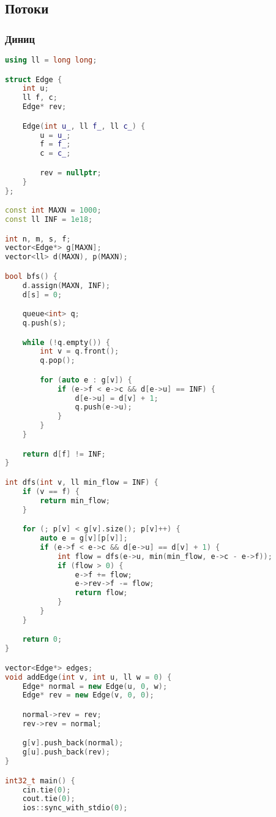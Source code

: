 \documentclass[10pt,a4paper,landscape,twosided]{extarticle}
\begin{document}
\begin{multicols}{3}
\subsection{Потоки}

\subsubsection{Диниц}
\begin{lstlisting}[language=C++]
using ll = long long;

struct Edge {
    int u;
    ll f, c;
    Edge* rev;

    Edge(int u_, ll f_, ll c_) {
        u = u_;
        f = f_;
        c = c_;

        rev = nullptr;
    }
};

const int MAXN = 1000;
const ll INF = 1e18;

int n, m, s, f;
vector<Edge*> g[MAXN];
vector<ll> d(MAXN), p(MAXN);

bool bfs() {
    d.assign(MAXN, INF);
    d[s] = 0;

    queue<int> q;
    q.push(s);

    while (!q.empty()) {
        int v = q.front();
        q.pop();

        for (auto e : g[v]) {
            if (e->f < e->c && d[e->u] == INF) {
                d[e->u] = d[v] + 1;
                q.push(e->u);
            }
        }
    }

    return d[f] != INF;
}

int dfs(int v, ll min_flow = INF) {
    if (v == f) {
        return min_flow;
    } 

    for (; p[v] < g[v].size(); p[v]++) {
        auto e = g[v][p[v]];
        if (e->f < e->c && d[e->u] == d[v] + 1) {
            int flow = dfs(e->u, min(min_flow, e->c - e->f));
            if (flow > 0) {
                e->f += flow;
                e->rev->f -= flow;
                return flow;
            }
        }
    }

    return 0;
}

vector<Edge*> edges;
void addEdge(int v, int u, ll w = 0) {
    Edge* normal = new Edge(u, 0, w);
    Edge* rev = new Edge(v, 0, 0);

    normal->rev = rev;
    rev->rev = normal;

    g[v].push_back(normal);
    g[u].push_back(rev);
}

int32_t main() {
    cin.tie(0);
    cout.tie(0);
    ios::sync_with_stdio(0);


\end{lstlisting}
\end{multicols}
\end{document}

